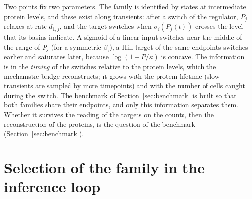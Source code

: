 \documentclass[a4paper, 11pt]{article}
\theoremstyle{plain}
\theoremstyle{remark}
\begin{document}
Two points fix two parameters. The family is identified by states at intermediate protein levels, and these exist along transients: after a switch of the regulator, $P_j$ relaxes at rate $d_{1,j}$, and the target switches when $\sigma_i(P_j(t))$ crosses the level that its basins indicate. A sigmoid of a linear input switches near the middle of the range of $P_j$ (for a symmetric $\beta_i$), a Hill target of the same endpoints switches earlier and saturates later, because $\log(1 + P/\kappa)$ is concave. The information is in the \emph{timing} of the switches relative to the protein levels, which the mechanistic bridge reconstructs; it grows with the protein lifetime (slow transients are sampled by more timepoints) and with the number of cells caught during the switch. The benchmark of Section~\ref{sec:benchmark} is built so that both families share their endpoints, and only this information separates them. Whether it survives the reading of the targets on the counts, then the reconstruction of the proteins, is the question of the benchmark (Section~\ref{sec:benchmark}).

\section{Selection of the family in the inference loop}\label{sec:selection}
\end{document}
